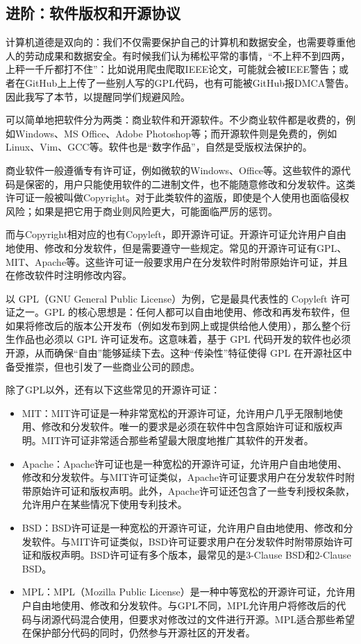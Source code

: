 \subsection{进阶：软件版权和开源协议}

计算机道德是双向的：我们不仅需要保护自己的计算机和数据安全，也需要尊重他人的劳动成果和数据安全。有时候我们认为稀松平常的事情，“不上秤不到四两，上秤一千斤都打不住”：比如说用爬虫爬取IEEE论文，可能就会被IEEE警告；或者在GitHub上上传了一些别人写的GPL代码，也有可能被GitHub报DMCA警告。因此我写了本节，以提醒同学们规避风险。

可以简单地把软件分为两类：商业软件和开源软件。不少商业软件都是收费的，例如Windows、MS Office、Adobe Photoshop等；而开源软件则是免费的，例如Linux、Vim、GCC等。软件也是“数字作品”，自然是受版权法保护的。

商业软件一般遵循专有许可证，例如微软的Windows、Office等。这些软件的源代码是保密的，用户只能使用软件的二进制文件，也不能随意修改和分发软件。这类许可证一般被叫做Copyright。对于此类软件的盗版，即使是个人使用也面临侵权风险；如果是把它用于商业则风险更大，可能面临严厉的惩罚。

而与Copyright相对应的也有Copyleft，即开源许可证。开源许可证允许用户自由地使用、修改和分发软件，但是需要遵守一些规定。常见的开源许可证有GPL、MIT、Apache等。这些许可证一般要求用户在分发软件时附带原始许可证，并且在修改软件时注明修改内容。

以 GPL（GNU General Public License）为例，它是最具代表性的 Copyleft 许可证之一。GPL 的核心思想是：任何人都可以自由地使用、修改和再发布软件，但如果将修改后的版本公开发布（例如发布到网上或提供给他人使用），那么整个衍生作品也必须以 GPL 许可证发布。这意味着，基于 GPL 代码开发的软件也必须开源，从而确保“自由”能够延续下去。这种“传染性”特征使得 GPL 在开源社区中备受推崇，但也引发了一些商业公司的顾虑。

除了GPL以外，还有以下这些常见的开源许可证：
\begin{itemize}
  \item MIT：MIT许可证是一种非常宽松的开源许可证，允许用户几乎无限制地使用、修改和分发软件。唯一的要求是必须在软件中包含原始许可证和版权声明。MIT许可证非常适合那些希望最大限度地推广其软件的开发者。
  \item Apache：Apache许可证也是一种宽松的开源许可证，允许用户自由地使用、修改和分发软件。与MIT许可证类似，Apache许可证要求用户在分发软件时附带原始许可证和版权声明。此外，Apache许可证还包含了一些专利授权条款，允许用户在某些情况下使用专利技术。
  \item BSD：BSD许可证是一种宽松的开源许可证，允许用户自由地使用、修改和分发软件。与MIT许可证类似，BSD许可证要求用户在分发软件时附带原始许可证和版权声明。BSD许可证有多个版本，最常见的是3-Clause BSD和2-Clause BSD。
  \item MPL：MPL（Mozilla Public License）是一种中等宽松的开源许可证，允许用户自由地使用、修改和分发软件。与GPL不同，MPL允许用户将修改后的代码与闭源代码混合使用，但要求对修改过的文件进行开源。MPL适合那些希望在保护部分代码的同时，仍然参与开源社区的开发者。
\end{itemize}

